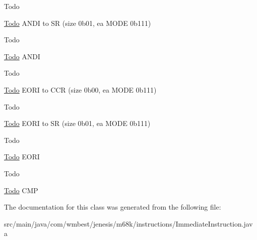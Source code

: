 \begin{DoxyRefDesc}{Todo}
\item[\hyperlink{todo__todo000010}{Todo}]A\-N\-D\-I to S\-R (size 0b01, ea M\-O\-D\-E 0b111) \end{DoxyRefDesc}


\begin{DoxyRefDesc}{Todo}
\item[\hyperlink{todo__todo000011}{Todo}]A\-N\-D\-I \end{DoxyRefDesc}


\begin{DoxyRefDesc}{Todo}
\item[\hyperlink{todo__todo000012}{Todo}]E\-O\-R\-I to C\-C\-R (size 0b00, ea M\-O\-D\-E 0b111) \end{DoxyRefDesc}


\begin{DoxyRefDesc}{Todo}
\item[\hyperlink{todo__todo000013}{Todo}]E\-O\-R\-I to S\-R (size 0b01, ea M\-O\-D\-E 0b111) \end{DoxyRefDesc}


\begin{DoxyRefDesc}{Todo}
\item[\hyperlink{todo__todo000014}{Todo}]E\-O\-R\-I \end{DoxyRefDesc}


\begin{DoxyRefDesc}{Todo}
\item[\hyperlink{todo__todo000015}{Todo}]C\-M\-P \end{DoxyRefDesc}


The documentation for this class was generated from the following file\-:\begin{DoxyCompactItemize}
\item 
src/main/java/com/wmbest/jenesis/m68k/instructions/Immediate\-Instruction.\-java\end{DoxyCompactItemize}
